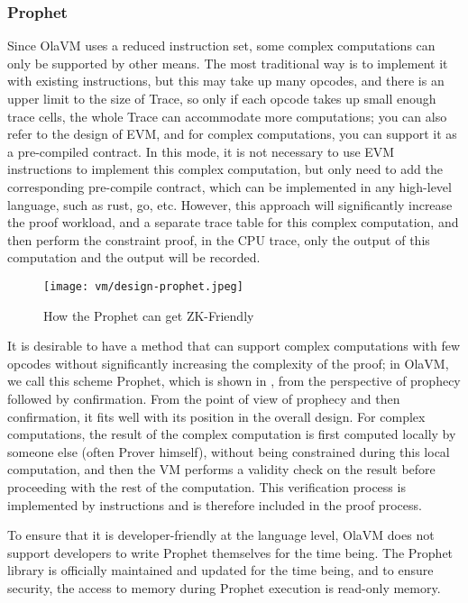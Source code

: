 \subsubsection{Prophet} \label{sec:design-prophet}

Since OlaVM uses a reduced instruction set, some complex computations can only be supported by other means. The most
traditional way is to implement it with existing instructions, but this may take up many opcodes, and there is an upper
limit to the size of Trace, so only if each opcode takes up small enough trace cells, the whole Trace can accommodate more
computations; you can also refer to the design of EVM, and for complex computations, you can support it as a pre-compiled
contract. In this mode, it is not necessary to use EVM instructions to implement this complex computation, but only need
to add the corresponding pre-compile contract, which can be implemented in any high-level language, such as rust, go, etc.
However, this approach will significantly increase the proof workload, and a separate trace table for this complex computation,
and then perform the constraint proof, in the CPU trace, only the output of this computation and the output will be recorded.

\begin{figure}[!ht]
    \centering
    \texttt{[image: vm/design-prophet.jpeg]}
    \caption{How the Prophet can get ZK-Friendly}
    \label{fig:desgin-prophet}
\end{figure}

It is desirable to have a method that can support complex computations with few opcodes without significantly increasing the
complexity of the proof; in OlaVM, we call this scheme Prophet, which is shown in , from the perspective
of prophecy followed by confirmation. From the point of view of prophecy and then confirmation, it fits well with its position
in the overall design. For complex computations, the result of the complex computation is first computed locally by someone else
(often Prover himself), without being constrained during this local computation, and then the VM performs a validity check on the
result before proceeding with the rest of the computation. This verification process is implemented by instructions and is therefore
included in the proof process.

To ensure that it is developer-friendly at the language level, OlaVM does not support developers to write Prophet themselves for
the time being. The Prophet library is officially maintained and updated for the time being, and to ensure security, the access to
memory during Prophet execution is read-only memory.

